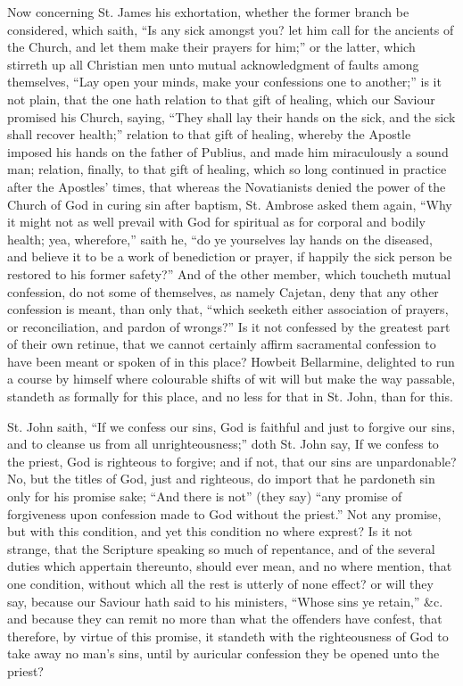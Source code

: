Now concerning St. James his exhortation, whether the former branch be considered, which saith, “Is any sick amongst you? let him call for the ancients of the Church, and let them make their prayers for him;” or the latter, which stirreth up all Christian men unto mutual acknowledgment of faults among themselves, “Lay open your minds, make your confessions one to another;” is it not plain, that the one hath relation to that gift of healing, which our Saviour promised his Church, saying, “They shall lay their hands on the sick, and the sick shall recover health;” relation to that gift of healing, whereby the Apostle imposed his hands on the father of Publius, and made him miraculously a sound man; relation, finally, to that gift of healing, which so long continued in practice after the Apostles’ times, that whereas the Novatianists denied the power of the Church of God in curing sin after baptism, St. Ambrose asked them again, “Why it might not as well prevail with God for spiritual as for corporal and bodily health; yea, wherefore,” saith he, “do ye yourselves lay hands on the diseased, and believe it to be a work of benediction or prayer, if happily the sick person be restored to his former safety?” And of the other member, which toucheth mutual confession, do not some of themselves, as namely Cajetan, deny that any other confession is meant, than only that, “which seeketh either association of prayers, or reconciliation, and pardon of wrongs?” Is it not confessed by the greatest part of their own retinue, that we cannot certainly affirm sacramental confession to have been meant or spoken of in this place? Howbeit Bellarmine, delighted to run a course by himself where colourable shifts of wit will but make the way passable, standeth as formally for this place, and no less for that in St. John, than for this.

St. John saith, “If we confess our sins, God is faithful and just to forgive our sins, and to cleanse us from all unrighteousness;” doth St. John say, If we confess to the priest, God is righteous to forgive; and if not, that our sins are unpardonable? No, but the titles of God, just and righteous, do import that he pardoneth sin only for his promise sake; “And there is not” (they say) “any promise of forgiveness upon confession made to God without the priest.” Not any promise, but with this condition, and yet this condition no where exprest? Is it not strange, that the Scripture speaking so much of repentance, and of the several duties which appertain thereunto, should ever mean, and no where mention, that one condition, without which all the rest is utterly of none effect? or will they say, because our Saviour hath said to his ministers, “Whose sins ye retain,” \&c. and because they can remit no more than what the offenders have confest, that therefore, by virtue of this promise, it standeth with the righteousness of God to take away no man’s sins, until by auricular confession they be opened unto the priest?

